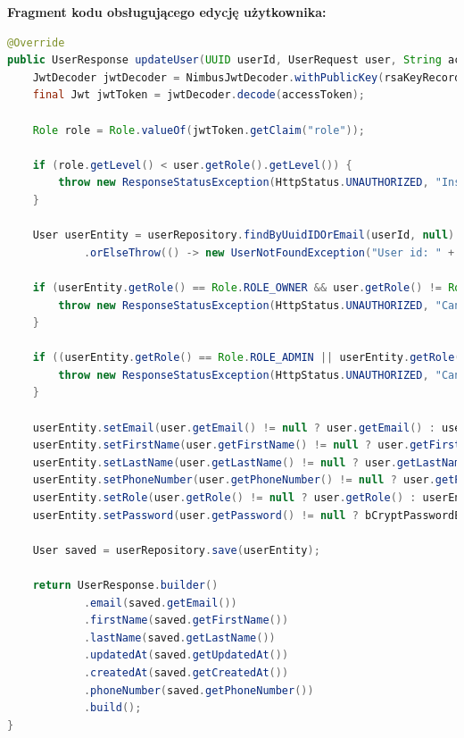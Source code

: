 \textbf{Fragment kodu obsługującego edycję użytkownika:}
\begin{lstlisting}[language=Java, caption=Edycja użytkownika w \texttt{UserServiceImp}]
@Override
public UserResponse updateUser(UUID userId, UserRequest user, String accessToken) throws UserNotFoundException {
    JwtDecoder jwtDecoder = NimbusJwtDecoder.withPublicKey(rsaKeyRecord.publicKey()).build();
    final Jwt jwtToken = jwtDecoder.decode(accessToken);

    Role role = Role.valueOf(jwtToken.getClaim("role"));

    if (role.getLevel() < user.getRole().getLevel()) {
        throw new ResponseStatusException(HttpStatus.UNAUTHORIZED, "Insufficient permissions to update or assign the role");
    }

    User userEntity = userRepository.findByUuidIDOrEmail(userId, null)
            .orElseThrow(() -> new UserNotFoundException("User id: " + userId + " not found"));

    if (userEntity.getRole() == Role.ROLE_OWNER && user.getRole() != Role.ROLE_OWNER) {
        throw new ResponseStatusException(HttpStatus.UNAUTHORIZED, "Cannot change the role of an OWNER");
    }

    if ((userEntity.getRole() == Role.ROLE_ADMIN || userEntity.getRole() == Role.ROLE_EMPLOYEE) && user.getRole() == Role.ROLE_OWNER) {
        throw new ResponseStatusException(HttpStatus.UNAUTHORIZED, "Cannot change the role to OWNER");
    }

    userEntity.setEmail(user.getEmail() != null ? user.getEmail() : userEntity.getEmail());
    userEntity.setFirstName(user.getFirstName() != null ? user.getFirstName() : userEntity.getFirstName());
    userEntity.setLastName(user.getLastName() != null ? user.getLastName() : userEntity.getLastName());
    userEntity.setPhoneNumber(user.getPhoneNumber() != null ? user.getPhoneNumber() : userEntity.getPhoneNumber());
    userEntity.setRole(user.getRole() != null ? user.getRole() : userEntity.getRole());
    userEntity.setPassword(user.getPassword() != null ? bCryptPasswordEncoder.encode(user.getPassword()) : userEntity.getPassword());

    User saved = userRepository.save(userEntity);

    return UserResponse.builder()
            .email(saved.getEmail())
            .firstName(saved.getFirstName())
            .lastName(saved.getLastName())
            .updatedAt(saved.getUpdatedAt())
            .createdAt(saved.getCreatedAt())
            .phoneNumber(saved.getPhoneNumber())
            .build();
}
\end{lstlisting}



